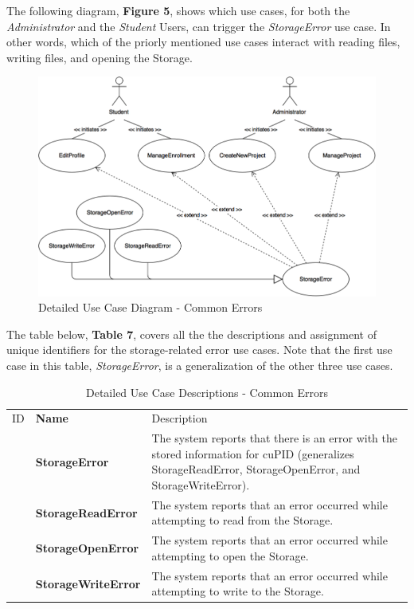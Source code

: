 \documentclass[12pt,letterpaper]{article}
\begin{document}
The following diagram, {\bf Figure 5}, shows which use cases, for both the {\it Administrator} and the {\it Student} Users, can trigger the {\it StorageError} use case. In other words, which of the 
priorly mentioned use cases interact with reading files, writing files, and opening the Storage.

\begin{figure}[H]
	\centering{}
	\includegraphics[scale=0.3]{imgs/detailed-common-error-use-case-diagram.png}
	\caption{Detailed Use Case Diagram - Common Errors}
\end{figure}

The table below, {\bf Table 7}, covers all the the descriptions and assignment of unique identifiers for the storage-related error use cases. Note that the first use case in this table, {\it StorageError}, is a generalization
of the other three use cases.

\begin{table}[H]
	\caption{Detailed Use Case Descriptions - Common Errors}
	\begin{tabu} to 
	    \tableheader{}ID & Name & Description\\
		\storageerror{} & StorageError &  The system reports that there is an error with the stored information for cuPID (generalizes StorageReadError, StorageOpenError, and StorageWriteError).\\
		\storagereaderror{} & StorageReadError & The system reports that an error occurred while attempting to read from the Storage.\\
		\storageopenerror{} & StorageOpenError & The system reports that an error occurred while attempting to open the Storage.\\
		\storagewriteerror{} & StorageWriteError & The system reports that an error occurred while attempting to write to the Storage.\\
	\end{tabu}
\end{table}
\end{document}
